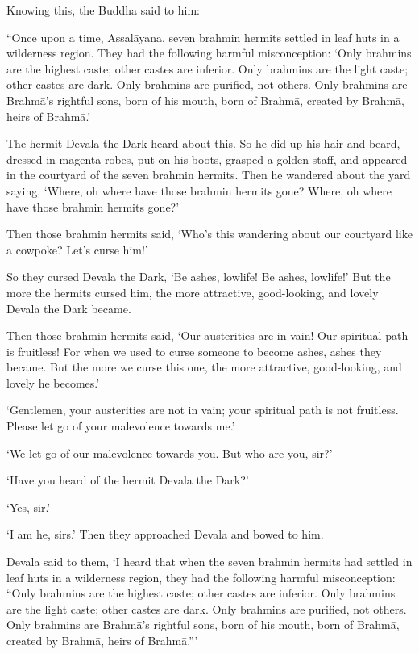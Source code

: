 \documentclass[12pt,openany]{book}%
\begin{document}
Knowing this, the Buddha said to him: 

“Once upon a time, \textsanskrit{Assalāyana}, seven brahmin hermits settled in leaf huts in a wilderness region. They had the following harmful misconception: ‘Only brahmins are the highest caste; other castes are inferior. Only brahmins are the light caste; other castes are dark. Only brahmins are purified, not others. Only brahmins are \textsanskrit{Brahmā}’s rightful sons, born of his mouth, born of \textsanskrit{Brahmā}, created by \textsanskrit{Brahmā}, heirs of \textsanskrit{Brahmā}.’ 

The hermit Devala the Dark heard about this. So he did up his hair and beard, dressed in magenta robes, put on his boots, grasped a golden staff, and appeared in the courtyard of the seven brahmin hermits. Then he wandered about the yard saying, ‘Where, oh where have those brahmin hermits gone? Where, oh where have those brahmin hermits gone?’ 

Then those brahmin hermits said, ‘Who’s this wandering about our courtyard like a cowpoke? Let’s curse him!’ 

So they cursed Devala the Dark, ‘Be ashes, lowlife! Be ashes, lowlife!’ But the more the hermits cursed him, the more attractive, good-looking, and lovely Devala the Dark became. 

Then those brahmin hermits said, ‘Our austerities are in vain! Our spiritual path is fruitless! For when we used to curse someone to become ashes, ashes they became. But the more we curse this one, the more attractive, good-looking, and lovely he becomes.’ 

‘Gentlemen, your austerities are not in vain; your spiritual path is not fruitless. Please let go of your malevolence towards me.’ 

‘We let go of our malevolence towards you. But who are you, sir?’ 

‘Have you heard of the hermit Devala the Dark?’ 

‘Yes, sir.’ 

‘I am he, sirs.’ Then they approached Devala and bowed to him. 

Devala said to them, ‘I heard that when the seven brahmin hermits had settled in leaf huts in a wilderness region, they had the following harmful misconception: “Only brahmins are the highest caste; other castes are inferior. Only brahmins are the light caste; other castes are dark. Only brahmins are purified, not others. Only brahmins are \textsanskrit{Brahmā}’s rightful sons, born of his mouth, born of \textsanskrit{Brahmā}, created by \textsanskrit{Brahmā}, heirs of \textsanskrit{Brahmā}.”’ 
\end{document}
